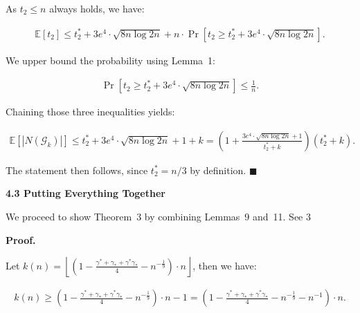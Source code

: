 \documentclass[10pt,a4paper]{article}
\begin{document}
As $t_{2}\leq n$ always holds, we have:\par


\[\begin{gathered}
\mathbb{E}[t_{2}]\leq t^{*}_{2}+3e^{4}\cdot\sqrt{8n\log{2n}}+n\cdot\Pr\left[t_{2}\geq t^{*}_{2}+3e^{4}\cdot\sqrt{8n\log{2n}}\right].
\end{gathered}\]


We upper bound the probability using Lemma 1:\par


\[\begin{gathered}
\Pr\left[t_{2}\geq t^{*}_{2}+3e^{4}\cdot\sqrt{8n\log{2n}}\right]\leq\frac{1}{n}.
\end{gathered}\]


Chaining those three inequalities yields:\par


\[\begin{gathered}
\mathbb{E}\left[|N(\mathcal{G}_{k})|\right]\leq t^{*}_{2}+3e^{4}\cdot\sqrt{8n\log{2n}}+1+k=\left(1+\frac{3e^{4}\cdot\sqrt{8n\log{2n}}+1}{t^{*}_{2}+k}\right)(t^{*}_{2}+k).
\end{gathered}\]


The statement then follows, since $t^{*}_{2}=n/3$ by definition.
\ensuremath{\blacksquare}\par






\par\medskip\noindent\textbf{4.3 Putting Everything Together}\par




We proceed to show Theorem 3 by combining Lemmas 9 and 11.
See 3\par




\par\medskip\noindent\textbf{Proof.}\par



Let $k(n)=\left\lfloor\left(1-\frac{\gamma^{*}+\gamma_{*}+\gamma^{*}\gamma_{*}}{4}-n^{-\frac{1}{9}}\right)\cdot n\right\rfloor$, then we have:\par


\[\begin{gathered}
\displaystyle k(n)\geq\left(1-\frac{\gamma^{*}+\gamma_{*}+\gamma^{*}\gamma_{*}}{4}-n^{-\frac{1}{9}}\right)\cdot n-1=\left(1-\frac{\gamma^{*}+\gamma_{*}+\gamma^{*}\gamma_{*}}{4}-n^{-\frac{1}{9}}-n^{-1}\right)\cdot n.
\end{gathered}\]
\end{document}
